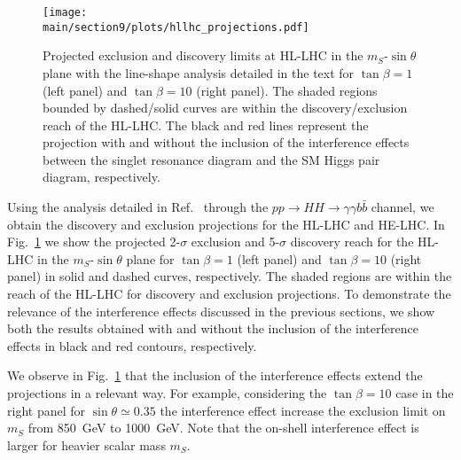 
\begin{figure}[t]
  \centering
  \texttt{[image: \\main/section9/plots/hllhc\_projections.pdf]}
  \caption{Projected exclusion and discovery limits at HL-LHC in the $m_S$-$\sin\theta$ plane with the line-shape analysis detailed in the text for $\tan\beta=1$ (left panel) and $\tan\beta=10$ (right panel). The shaded regions bounded by dashed/solid curves are within the discovery/exclusion reach of the HL-LHC. The black and red lines represent the projection with and without the inclusion of the interference effects between the singlet resonance diagram and the SM Higgs pair diagram, respectively.
  }
  \label{fig:HLprojection}
\end{figure} 

Using the analysis detailed in Ref.~\cite{Carena:2018vpt} through the $pp\to HH \to \gamma\gamma b\bar b$ channel, we obtain the discovery and exclusion projections for the HL-LHC and HE-LHC.
In Fig.~\ref{fig:HLprojection} we show the projected 2-$\sigma$ exclusion and 5-$\sigma$ discovery reach for the HL-LHC in the $m_S$-$\sin\theta$ plane for $\tan\beta=1$ (left panel) and $\tan\beta=10$ (right panel) in solid and dashed curves, respectively. The shaded regions are within the reach of the HL-LHC for discovery and exclusion projections. To demonstrate the relevance of the interference effects discussed in the previous sections, we show both the results obtained with and without the inclusion of the interference effects in black and red contours, respectively. 

We observe in Fig.~\ref{fig:HLprojection} that the inclusion of the interference effects extend the projections in a relevant way. For example, considering the $\tan\beta=10$ case in the right panel for $\sin\theta\simeq 0.35$ the interference effect increase the exclusion limit on $m_S$ from 850~GeV to 1000~GeV.
Note that the on-shell interference effect is larger for heavier scalar mass $m_S$. 


